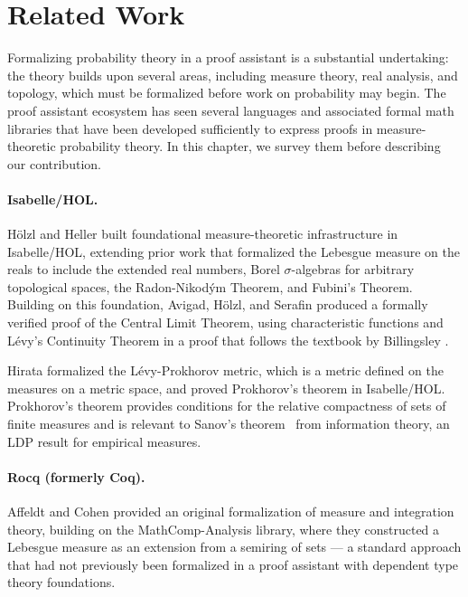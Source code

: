 \documentclass{article}
\begin{document}
\section{Related Work}
\label{sec:related-work}

Formalizing probability theory in a proof assistant is a substantial undertaking: the theory builds
upon several areas, including measure theory, real analysis, and topology, which must be formalized
before work on probability may begin. The proof assistant ecosystem has seen several languages
and associated formal math libraries that have been developed sufficiently to express proofs in
measure-theoretic probability theory. In this chapter, we survey them before describing our
contribution.

\paragraph{Isabelle/HOL.}
H{\"o}lzl and Heller \cite{holzl2011} built foundational measure-theoretic infrastructure in
Isabelle/HOL, extending prior work that formalized the Lebesgue measure on the reals to
include the extended real numbers, Borel $\sigma$-algebras for arbitrary topological spaces,
the Radon-Nikod{\'y}m Theorem, and Fubini's Theorem.
Building on this foundation, Avigad, H{\"o}lzl, and Serafin \cite{avigad2017clt} produced a formally
verified proof of the Central Limit Theorem, using characteristic functions and L{\'e}vy's
Continuity Theorem in a proof that follows the textbook by Billingsley \cite{billingsley1995}.

Hirata \cite{hirata2024levy} formalized the L{\'e}vy-Prokhorov metric, which is a metric defined
on the measures on a metric space, and proved Prokhorov's theorem in Isabelle/HOL.
Prokhorov's theorem provides conditions for the relative compactness of sets of finite measures and
is relevant to Sanov's theorem~\cite{dembo1998large} from information theory, an LDP result for empirical measures.

\paragraph{Rocq (formerly Coq).}
Affeldt and Cohen \cite{affeldt2023} provided an original formalization of measure and integration
theory, building on the MathComp-Analysis library, where they constructed a Lebesgue measure as an
extension from a semiring of sets --- a standard approach that had not previously been formalized in a proof assistant with dependent type theory foundations.
\end{document}
